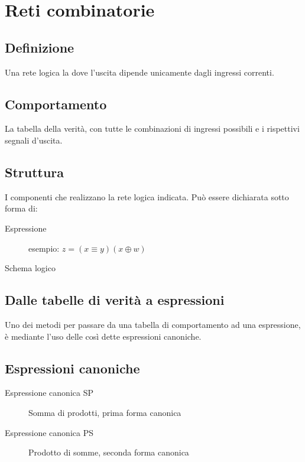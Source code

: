 \documentclass{article}
\begin{document}
\section{Reti combinatorie}

\subsection{Definizione}

Una rete logica la dove l'uscita dipende unicamente dagli ingressi correnti.

\subsection{Comportamento}

La tabella della verità, con tutte le combinazioni di ingressi possibili e i rispettivi segnali d'uscita.

\subsection{Struttura}

I componenti che realizzano la rete logica indicata. Può essere dichiarata sotto forma di:

\begin{description}
	\item[Espressione] esempio: $z = (x \equiv y)(x \oplus w)$
	\item[Schema logico]
\end{description}

\subsection{Dalle tabelle di verità a espressioni}

Uno dei metodi per passare da una tabella di comportamento ad una espressione, è mediante l'uso delle così dette espressioni canoniche.

\subsection{Espressioni canoniche}

\begin{description}
	\item[Espressione canonica SP] Somma di prodotti, prima forma canonica
	\item[Espressione canonica PS] Prodotto di somme, seconda forma canonica
\end{description}
\end{document}
